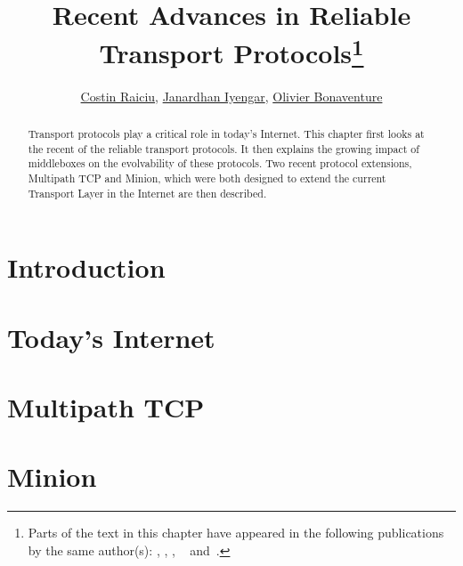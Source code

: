 \documentclass{article}
\title{Recent Advances in Reliable Transport Protocols\footnote{
Parts of the text in this chapter have appeared in the following
 publications by the same author(s): \cite{login}, \cite{mptcp-cc},
 \cite{raiciu2012hard}, ~\cite{nowlan12fitting} 
and~\cite{iyengar10minion}.}
}
\author{\href{http://nets.cs.pub.ro/~costin/}{Costin Raiciu}, \href{http://www.fandm.edu/janardhan-iyengar}{Janardhan Iyengar}, \href{http://perso.uclouvain.be/olivier.bonaventure}{Olivier Bonaventure}}
\date{}
\begin{document}
\copyrightstatement

\pagestyle{empty}

\maketitle

\thispagestyle{empty}

\begin{abstract}
Transport protocols play a critical role in today's Internet. This
chapter first looks at the recent of the reliable transport
protocols. It then explains the growing impact of middleboxes on the
evolvability of these protocols. 
Two recent protocol extensions,
Multipath TCP and Minion,
which were both designed to extend the current Transport Layer 
in the Internet
are then described.
\end{abstract}


\section{Introduction}




\section{Today's Internet}\label{section:today}





%

\section{Multipath TCP}\label{section:mptcp}




\section{Minion}\label{section:minion}




\end{document}
